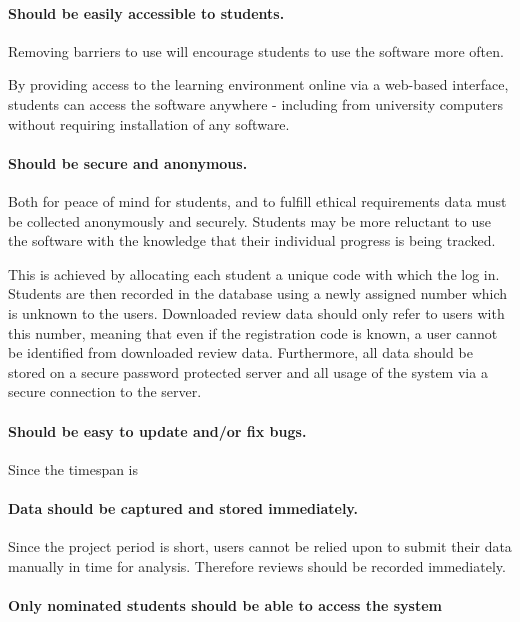 \paragraph{Should be easily accessible to students.} Removing barriers to use will
encourage students to use the software more often. %

By providing access to the learning environment online via a web-based interface, students can
access the software anywhere - including from university computers without requiring installation
of any software.

\paragraph{Should be secure and anonymous.} Both for peace of mind for students, and to fulfill
ethical requirements data must be collected anonymously and securely. Students may be more
reluctant to use the software with the knowledge that their individual progress is being tracked. %

This is achieved by allocating each student a unique code with which the log in. Students are then
recorded in the database using a newly assigned number which is unknown to the users. Downloaded review
data should only refer to users with this number, meaning that even if the registration code is known,
a user cannot be identified from downloaded review data. Furthermore, all data should be stored on a secure
password protected server and all usage of the system via a secure connection to the server.

\paragraph{Should be easy to update and/or fix bugs.} Since the timespan is 

\paragraph{Data should be captured and stored immediately.} Since the project period is short,
users cannot be relied upon to submit their data manually in time for analysis. Therefore reviews
should be recorded immediately.

\paragraph{Only nominated students should be able to access the system}

